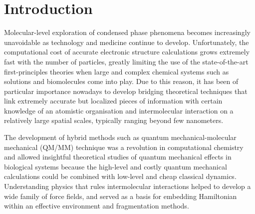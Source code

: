 \documentclass[aip,amsmath,amssymb,reprint,floatfix]{revtex4-1}
\begin{document}
\section{\label{s:1}Introduction}

Molecular\hyp{}level exploration of condensed phase phenomena becomes increasingly unavoidable
as technology and medicine continue to develop. Unfortunately, the computational cost of accurate
electronic structure calculations grows extremely fast with the number of particles, greatly limiting
the use of the state\hyp{}of\hyp{}the\hyp{}art first\hyp{}principles theories 
when large and complex chemical systems such as
solutions and biomolecules come into play.\cite{Tomasi.Mennucci.Cammi.ChemRev.2005}
Due to this reason, it has been of particular importance nowadays 
to develop bridging theoretical techniques that link
extremely accurate but localized pieces of information 
with certain knowledge of an atomistic organisation and intermolecular interaction
on a relatively large spatial scales, typically ranging beyond few nanometers. 

The development of hybrid methods such as quantum mechanical\hyp{}molecular mechanical (QM/MM)
technique was a revolution in computational chemistry and allowed insightful theoretical studies
of quantum mechanical effects in biological systems because the high\hyp{}level
and costly quantum mechanical calculations
could be combined with low\hyp{}level and cheap classical dynamics.\cite{Warshel.Levitt.JMolBiol.1976,Senn.Thiel.Angew.2009}
Understanding physics that rules intermolecular interactions\cite{Jeziorski.Moszynski.Szalewicz.ChemRev.1994} 
helped to develop
a wide family of force fields, and served as a basis for embedding Hamiltonian
within an effective environment and fragmentation methods.\cite{Gordon.Fedorov.Pruitt.Slipchenko.ChemRev.2012}
\end{document}
